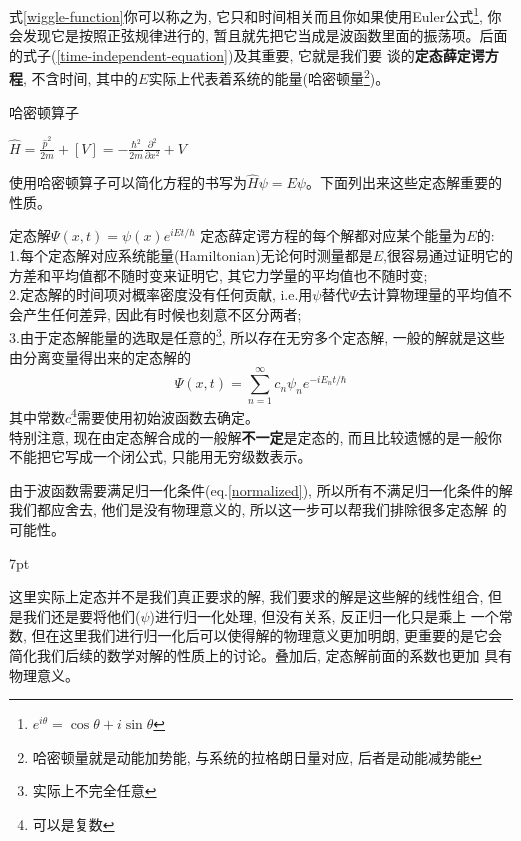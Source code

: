 \documentclass[a4paper,zihao=-4,linespread=1]{ctexrep}
\newenvironment{lequation}{\large\begin{equation}}{\end{equation}}
\newenvironment{thinknote}{%
\def\FrameCommand{%
\hspace{1pt}%
{\color{BurlyWood}\vrule width 2pt}%
{\color{formalshade}\vrule width 4pt}%
\colorbox{formalshade}%
}%
\MakeFramed{\advance\hsize-\width\FrameRestore}%
\noindent\hspace{-4.55pt}%
\begin{adjustwidth}{}{7pt}%
\vspace{2pt}\vspace{2pt}%
}
{%
\vspace{2pt}\end{adjustwidth}\endMakeFramed%
}
\begin{document}
    式\ref{wiggle-function}你可以称之为, 它只和时间相关而且你如果使用Euler公式\footnote{$e^{i\theta}=\cos\theta+i\sin\theta$}, 你
    会发现它是按照正弦规律进行的, 暂且就先把它当成是波函数里面的振荡项。后面的式子(\ref{time-independent-equation})及其重要, 它就是我们要
    谈的\textbf{定态薛定谔方程}, 不含时间, 其中的$E$实际上代表着系统的能量(哈密顿量\footnote{哈密顿量就是动能加势能, 与系统的拉格朗日量对应, 后者是动能减势能})。
    \begin{define}{哈密顿算子}
        \begin{center}
           \begin{math}
            \displaystyle
            \hat{H}=\frac{\hat{p}^2}{2m}+[V]=-\frac{\hbar^2}{2m}\frac{\partial^2}{\partial x^2}+V
        \end{math} 
        \end{center}
    \end{define}
    使用哈密顿算子可以简化方程的书写为$\hat{H}\psi=E\psi$。下面列出来这些定态解重要的性质。
    \begin{theorem}{定态解$\Psi(x,t)=\psi(x)e^{iEt/\hbar}$}
        定态薛定谔方程的每个解都对应某个能量为$E$的:\\
        1.每个定态解对应系统能量(Hamiltonian)无论何时测量都是$E$,很容易通过证明它的方差和平均值都不随时变来证明它, 其它力学量的平均值也不随时变;\\
        2.定态解的时间项对概率密度没有任何贡献, i.e.用$\psi$替代$\Psi$去计算物理量的平均值不会产生任何差异, 因此有时候也刻意不区分两者;\\
        3.由于定态解能量的选取是任意的\footnote{实际上不完全任意}, 所以存在无穷多个定态解, 一般的解就是这些由分离变量得出来的定态解的
        \begin{lequation}
            \label{find_c}
            \boxed{
                \Psi(x,t)=\sum_{n=1}^{\infty}c_n\psi_n e^{-iE_nt/\hbar}
            }
        \end{lequation}
        其中常数$c$\footnote{可以是复数}需要使用初始波函数去确定。\\
        特别注意, 现在由定态解合成的一般解\textbf{不一定}是定态的, 而且比较遗憾的是一般你不能把它写成一个闭公式, 只能用无穷级数表示。
    \end{theorem}
    由于波函数需要满足归一化条件(eq.\ref{normalized}), 所以所有不满足归一化条件的解我们都应舍去, 他们是没有物理意义的, 所以这一步可以帮我们排除很多定态解
    的可能性。
    \begin{thinknote}
        这里实际上定态并不是我们真正要求的解, 我们要求的解是这些解的线性组合, 但是我们还是要将他们($\psi$)进行归一化处理, 但没有关系, 反正归一化只是乘上
        一个常数, 但在这里我们进行归一化后可以使得解的物理意义更加明朗, 更重要的是它会简化我们后续的数学对解的性质上的讨论。叠加后, 定态解前面的系数也更加
        具有物理意义。
    \end{thinknote}
\end{document}
